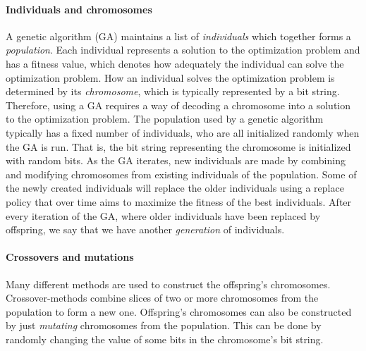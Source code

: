 \paragraph{Individuals and chromosomes}
A genetic algorithm (GA) maintains a list of \emph{individuals} which together forms a \emph{population}. 
Each individual represents a solution to the optimization problem and has a fitness value, which
denotes how adequately the individual can solve the optimization problem.
How an individual solves the optimization problem is determined by its \emph{chromosome}, which
is typically represented by a bit string. Therefore, using a GA requires a way of decoding
a chromosome into a solution to the optimization problem.
The population used by a genetic algorithm typically has a fixed number of individuals, who are
all initialized randomly when the GA is run. That is, the bit string representing the chromosome is
initialized with random bits.
As the GA iterates, new individuals are made by combining and modifying chromosomes from existing
individuals of the population.
Some of the newly created individuals will replace the older individuals using a replace policy
that over time aims to maximize the fitness of the best individuals.
After every iteration of the GA, where older individuals have been replaced by offspring, we
say that we have another \emph{generation} of individuals.

\paragraph{Crossovers and mutations}
Many different methods are used to construct the offspring's chromosomes.
Crossover-methods combine slices of two or more chromosomes from the population to form a new one.
Offspring's chromosomes can also be constructed by just \emph{mutating} chromosomes from the population.
This can be done by randomly changing the value of some bits in the chromosome's bit string.








